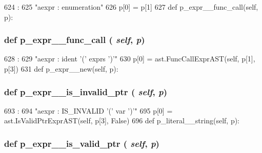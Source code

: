 \begin{DoxyCode}
624                                     :
625         "aexpr : enumeration"
626         p[0] = p[1]
627 
    def p_expr__func_call(self, p):
\end{DoxyCode}
\hypertarget{classslicc_1_1parser_1_1SLICC_acea928fb7b3faee78d787636d4acfadf}{
\subsubsection[{p\_\-expr\_\-\_\-func\_\-call}]{\setlength{\rightskip}{0pt plus 5cm}def p\_\-expr\_\-\_\-func\_\-call ( {\em self}, \/   {\em p})}}
\label{classslicc_1_1parser_1_1SLICC_acea928fb7b3faee78d787636d4acfadf}



\begin{DoxyCode}
628                                   :
629         "aexpr : ident '(' exprs ')'"
630         p[0] = ast.FuncCallExprAST(self, p[1], p[3])
631 
    def p_expr__new(self, p):
\end{DoxyCode}
\hypertarget{classslicc_1_1parser_1_1SLICC_ae494093204d4dfecd7df80dc30f4e77c}{
\subsubsection[{p\_\-expr\_\-\_\-is\_\-invalid\_\-ptr}]{\setlength{\rightskip}{0pt plus 5cm}def p\_\-expr\_\-\_\-is\_\-invalid\_\-ptr ( {\em self}, \/   {\em p})}}
\label{classslicc_1_1parser_1_1SLICC_ae494093204d4dfecd7df80dc30f4e77c}



\begin{DoxyCode}
693                                        :
694         "aexpr : IS_INVALID '(' var ')'"
695         p[0] = ast.IsValidPtrExprAST(self, p[3], False)
696 
    def p_literal__string(self, p):
\end{DoxyCode}
\hypertarget{classslicc_1_1parser_1_1SLICC_a4986f46b64e780add34eae04d1e4647e}{
\subsubsection[{p\_\-expr\_\-\_\-is\_\-valid\_\-ptr}]{\setlength{\rightskip}{0pt plus 5cm}def p\_\-expr\_\-\_\-is\_\-valid\_\-ptr ( {\em self}, \/   {\em p})}}
\label{classslicc_1_1parser_1_1SLICC_a4986f46b64e780add34eae04d1e4647e}



